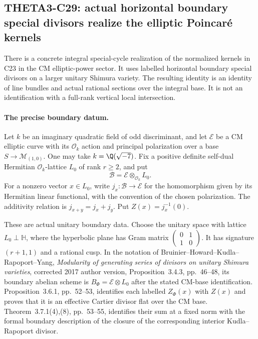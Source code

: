 \subsection{THETA3-C29: actual horizontal boundary special divisors realize the elliptic Poincar\'e kernels}\label{C29}

There is a concrete integral special-cycle realization of the
normalized kernels in C23 in the CM elliptic-power sector.
It uses labelled horizontal boundary special divisors on a
larger unitary Shimura variety. The resulting identity is an
identity of line bundles and actual rational sections over
the integral base. It is not an identification with a
full-rank vertical local intersection.

\paragraph{The precise boundary datum.}
Let $k$ be an imaginary quadratic field of odd discriminant,
and let $\mathcal E$ be a CM elliptic curve with its
$\mathcal O_k$ action and principal polarization over a
base $S\to\mathcal M_{(1,0)}$. One may take
$k=\Q(\sqrt{-7})$. Fix a positive definite self-dual
Hermitian $\mathcal O_k$-lattice $L_0$ of rank $r\geq2$,
and put
\[
                  \mathcal B=\mathcal E\otimes_{\mathcal O_k}L_0.
\]
For a nonzero vector $x\in L_0$, write
$j_x:\mathcal B\to\mathcal E$ for the homomorphism
given by its Hermitian linear functional, with the convention
of the chosen polarization. The additivity relation is
$j_{x+y}=j_x+j_y$. Put $Z(x)=j_x^{-1}(0)$.

These are actual unitary boundary data. Choose the unitary
space with lattice $L_0\perp\mathbb H$, where the
hyperbolic plane has Gram matrix
$\left(\begin{smallmatrix}0&1\\1&0\end{smallmatrix}\right)$.
It has signature $(r+1,1)$ and a rational cusp. In the
notation of Bruinier--Howard--Kudla--Rapoport--Yang,
\emph{Modularity of generating series of divisors on unitary
Shimura varieties}, corrected 2017 author version,
Proposition~3.4.3, pp.~46--48, its boundary abelian scheme
is $B_\Phi=\mathcal E\otimes L_0$ after the stated
CM-base identification. Proposition~3.6.1, pp.~52--53,
identifies each labelled $Z_\Phi(x)$ with $Z(x)$ and
proves that it is an effective Cartier divisor flat over
the CM base. Theorem~3.7.1(4),(8), pp.~53--55,
identifies their sum at a fixed norm with the formal
boundary description of the closure of the corresponding
interior Kudla--Rapoport divisor.

